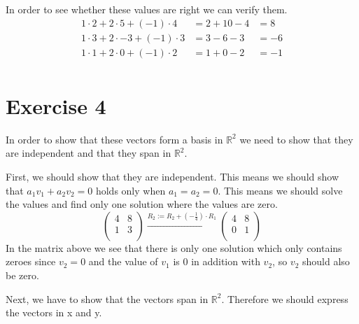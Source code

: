 \documentclass[a4paper]{article}
\begin{document}
In order to see whether these values are right we can verify them.
\begin{align*}
  1 \cdot 2 + 2 \cdot 5 + (-1) \cdot 4 &= 2 + 10 - 4 &= 8 \\
  1 \cdot 3 + 2 \cdot -3 + (-1) \cdot 3 &= 3 - 6 - 3 &= -6 \\
  1 \cdot 1 + 2 \cdot 0 + (-1) \cdot 2 &= 1 + 0 - 2 &= -1 \\
\end{align*}

\section*{Exercise 4}
In order to show that these vectors form a basis in $\mathbb{R}^2$ we need to show that they are independent and that they span in $\mathbb{R}^2$.

First, we should show that they are independent. This means we should show that $a_1 v_1 + a_2 v_2 = 0$ holds only when $a_1 = a_2 = 0$. This means we should solve the values and find only one solution where the values are zero.
\[
\left(
\begin{array}{cc}
4 & 8 \\
1 & 3 \\
\end{array}
\right)
\xrightarrow{\text{$R_2 := R_2 + (- \frac{1}{4}) \cdot R_1$}}
\left(
\begin{array}{cc}
4 & 8 \\
0 & 1 \\
\end{array}
\right)
\]
In the matrix above we see that there is only one solution which only contains zeroes since $v_2 = 0$ and the value of $v_1$ is 0 in addition with $v_2$, so $v_2$ should also be zero.

Next, we have to show that the vectors span in $\mathbb{R}^2$. Therefore we should express the vectors in x and y.
\end{document}
